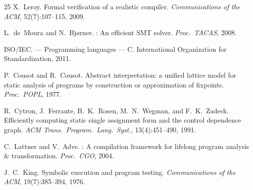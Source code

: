 \documentclass[11pt,a4paper]{article}
\begin{document}
\begin{thebibliography}{25}
X.~Leroy.
\newblock Formal verification of a realistic compiler.
\newblock \emph{Communications of the ACM}, 52(7):107--115, 2009.

L.~de~Moura and N.~Bj{\o}rner.
: An efficient {SMT} solver.
\newblock \emph{Proc.\ TACAS}, 2008.

{ISO/IEC}.
 --- {P}rogramming languages --- {C}.
\newblock International Organization for Standardization, 2011.

P.~Cousot and R.~Cousot.
\newblock Abstract interpretation: a unified lattice model for static analysis of programs by construction or approximation of fixpoints.
\newblock \emph{Proc.\ POPL}, 1977.

R.~Cytron, J.~Ferrante, B.~K.~Rosen, M.~N.~Wegman, and F.~K.~Zadeck.
\newblock Efficiently computing static single assignment form and the control dependence graph.
\newblock \emph{ACM Trans.\ Program.\ Lang.\ Syst.}, 13(4):451--490, 1991.

C.~Lattner and V.~Adve.
: A compilation framework for lifelong program analysis \& transformation.
\newblock \emph{Proc.\ CGO}, 2004.

J.~C.~King.
\newblock Symbolic execution and program testing.
\newblock \emph{Communications of the ACM}, 19(7):385--394, 1976.

\end{thebibliography}
\end{document}

